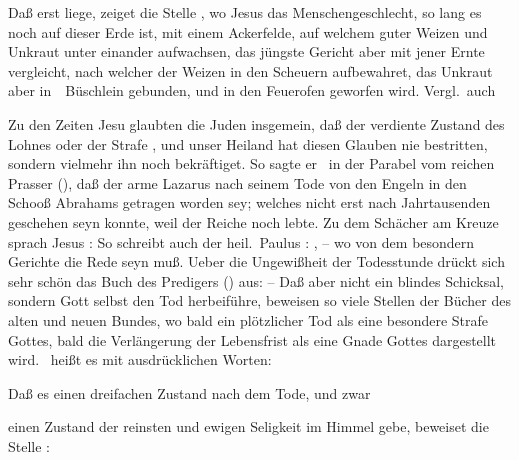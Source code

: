 \begin{aufza}
\item Daß erst  liege, zeiget die Stelle , wo Jesus das Menschengeschlecht, so lang es noch auf dieser Erde ist, mit einem Ackerfelde, auf welchem guter Weizen und Unkraut unter einander aufwachsen, das jüngste Gericht aber mit jener Ernte vergleicht, nach welcher der Weizen in den Scheuern aufbewahret, das Unkraut aber in~\ Büschlein gebunden, und in den Feuerofen geworfen wird. Vergl.\ auch 
\item Zu den Zeiten Jesu glaubten die Juden insgemein, daß der verdiente Zustand des Lohnes oder der Strafe , und unser Heiland hat diesen Glauben nie bestritten, sondern vielmehr ihn noch bekräftiget. So sagte er \zB\ in der Parabel vom reichen Prasser (), daß der arme Lazarus nach seinem Tode von den Engeln in den Schooß Abrahams getragen worden sey; welches nicht erst nach Jahrtausenden geschehen seyn konnte, weil der Reiche noch lebte. Zu dem Schächer am Kreuze sprach Jesus :  So schreibt auch der heil.\ Paulus : , -- wo von dem besondern Gerichte die Rede seyn muß. Ueber die Ungewißheit der Todesstunde drückt sich sehr schön das Buch des Predigers () aus:  -- Daß aber nicht ein blindes Schicksal, sondern Gott selbst den Tod herbeiführe, beweisen so viele Stellen der Bücher des alten und neuen Bundes, wo bald ein plötzlicher Tod als eine besondere Strafe Gottes, bald die Verlängerung der Lebensfrist als eine Gnade Gottes dargestellt wird. \ heißt es mit ausdrücklichen Worten: 
\item Daß es einen dreifachen Zustand nach dem Tode, und zwar
\begin{aufzb}
\item einen Zustand der reinsten und ewigen Seligkeit im Himmel gebe, beweiset die Stelle : 

\end{aufzb}
\end{aufza}
